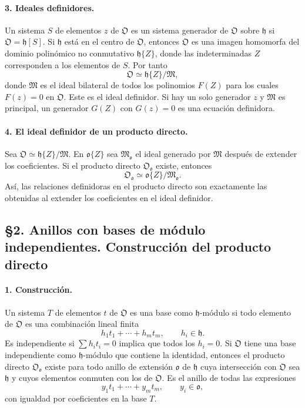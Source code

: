 \paragraph{3. Ideales definidores.}
Un sistema $S$ de elementos $z$ de $\mathfrak O$ es un sistema generador de $\mathfrak O$ sobre $\mathfrak h$ si $\mathfrak O=\mathfrak h[S]$. Si $\mathfrak h$ está en el centro de $\mathfrak O$, entonces $\mathfrak O$ es una imagen homomorfa del dominio polinómico no conmutativo $\mathfrak h\{Z\}$, donde las indeterminadas $Z$ corresponden a los elementos de $S$. Por tanto
\[
        \mathfrak O\simeq \mathfrak h\{Z\}/\mathfrak M,
\]
donde $\mathfrak M$ es el ideal bilateral de todos los polinomios $F(Z)$ para los cuales $F(z)=0$ en $\mathfrak O$. Este es el ideal definidor. Si hay un solo generador $z$ y $\mathfrak M$ es principal, un generador $G(Z)$ con $G(z)=0$ es una ecuación definidora.

\paragraph{4. El ideal definidor de un producto directo.}
Sea $\mathfrak O\simeq\mathfrak h\{Z\}/\mathfrak M$. En $\mathfrak o\{Z\}$ sea $\mathfrak M_{\mathfrak o}$ el ideal generado por $\mathfrak M$ después de extender los coeficientes. Si el producto directo $\mathfrak O_{\mathfrak o}$ existe, entonces
\[
        \mathfrak O_{\mathfrak o}\simeq \mathfrak o\{Z\}/\mathfrak M_{\mathfrak o}.
\]
Así, las relaciones definidoras en el producto directo son exactamente las obtenidas al extender los coeficientes en el ideal definidor.

\subsection*{§2. Anillos con bases de módulo independientes. Construcción del producto directo}

\paragraph{1. Construcción.}
Un sistema $T$ de elementos $t$ de $\mathfrak O$ es una base como $\mathfrak h$-módulo si todo elemento de $\mathfrak O$ es una combinación lineal finita
\[
        h_1t_1+\cdots+h_mt_m,
        \qquad h_i\in\mathfrak h.
\]
Es independiente si $\sum h_it_i=0$ implica que todos los $h_i=0$. Si $\mathfrak O$ tiene una base independiente como $\mathfrak h$-módulo que contiene la identidad, entonces el producto directo $\mathfrak O_{\mathfrak o}$ existe para todo anillo de extensión $\mathfrak o$ de $\mathfrak h$ cuya intersección con $\mathfrak O$ sea $\mathfrak h$ y cuyos elementos conmuten con los de $\mathfrak O$. Es el anillo de todas las expresiones
\[
        y_1t_1+\cdots+y_mt_m,
        \qquad y_i\in\mathfrak o,
\]
con igualdad por coeficientes en la base $T$.

